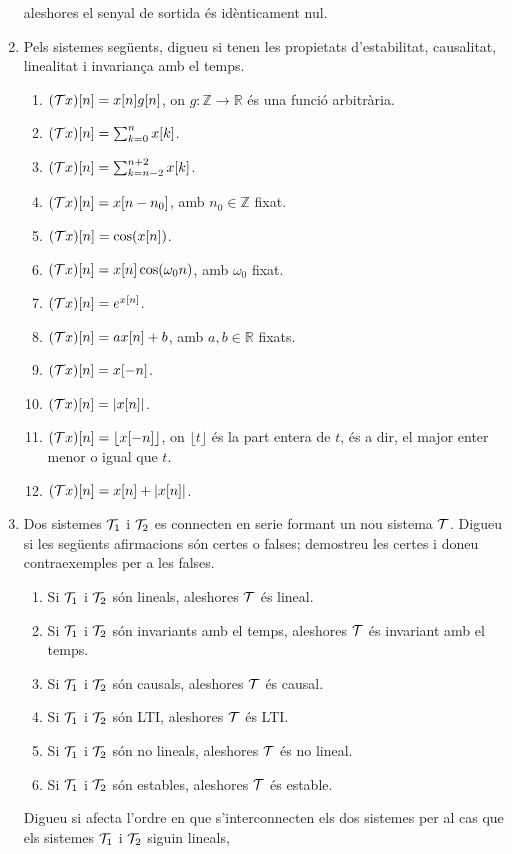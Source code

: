 \documentclass[a4paper,12pt]{article}
\newcommand\Z{\mathbb{Z}}
\newcommand\cT{{\cal T}}
\newcommand\bR{\mathbb{R}}
\begin{document}
\begin{enumerate}
  aleshores el senyal de sortida és idènticament nul.
\item Pels sistemes següents, digueu si tenen les propietats
  d'estabilitat, causalitat, linealitat i invariança amb el temps.
  \begin{enumerate}
  \item $(\cT x)[n]=x[n]g[n]$, on $g:\Z\to\bR$ és una funció arbitrària.
  \item $(\cT x)[n]=\sum_{k=0}^n x[k]$.
  \item $(\cT x)[n]=\sum_{k=n-2}^{n+2} x[k]$.
  \item $(\cT x)[n]=x[n-n_0]$, amb $n_0\in\Z$ fixat.
  \item $(\cT x)[n]=\cos(x[n])$.
  \item $(\cT x)[n]=x[n]\cos(\omega_0n)$, amb $\omega_0$ fixat.
  \item $(\cT x)[n]=e^{x[n]}$.
  \item $(\cT x)[n]=ax[n]+b$, amb $a,b\in\bR$ fixats.
  \item $(\cT x)[n]=x[-n]$.
  \item $(\cT x)[n]=|x[n]|$.
  \item $(\cT x)[n]=\lfloor x[-n] \rfloor$, on $\lfloor t\rfloor$ és
    la part entera de $t$, és a dir, el major enter menor o igual que $t$.
  \item $(\cT x)[n]=x[n]+|x[n]|$.
  \end{enumerate}
\item Dos sistemes $\cT_1$ i $\cT_2$ es connecten en serie formant un
  nou sistema $\cT$. Digueu si les següents afirmacions són certes o
  falses; demostreu les certes i doneu contraexemples per a les
  falses.
  \begin{enumerate}
  \item Si $\cT_1$ i $\cT_2$ són lineals, aleshores $\cT$ és lineal.
  \item Si $\cT_1$ i $\cT_2$ són invariants amb el temps, aleshores
    $\cT$ és invariant amb el temps. 
  \item Si $\cT_1$ i $\cT_2$ són causals, aleshores $\cT$ és causal.
  \item Si $\cT_1$ i $\cT_2$ són LTI, aleshores $\cT$ és LTI.
  \item Si $\cT_1$ i $\cT_2$ són no lineals, aleshores $\cT$ és no lineal.
  \item Si $\cT_1$ i $\cT_2$ són estables, aleshores $\cT$ és estable.
  \end{enumerate}
  Digueu si afecta l'ordre en que s'interconnecten els dos sistemes
  per al cas que els sistemes $\cT_1$ i $\cT_2$ siguin lineals,

\end{enumerate}
\end{document}
